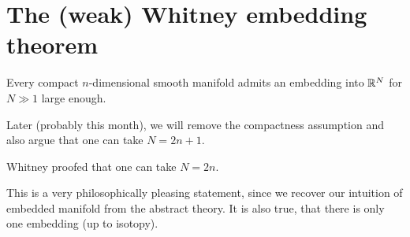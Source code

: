 \section{The (weak) Whitney embedding theorem}

\begin{theorem}[Whitney]\label{thm:5.6:whithney}
    Every compact \(n\)-dimensional smooth manifold admits an embedding into \(\mathbb{R}^N\) for 
    \(N\gg 1\) large enough.
\end{theorem}

\begin{remark}
    Later (probably this month), we will remove the compactness assumption and also argue that one 
    can take \(N=2n+1\).

    Whitney proofed that one can take \(N=2n\).
\end{remark}

\begin{aremark}
This is a very philosophically pleasing statement, since we recover our intuition of embedded manifold from the abstract theory. It is also true, that there is only one embedding (up to isotopy). 
\end{aremark}

